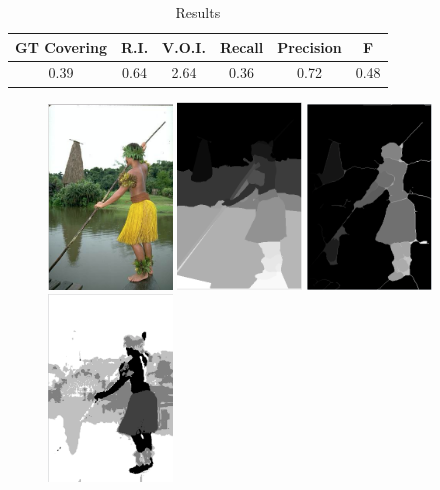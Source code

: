 \documentclass[10pt, twocolumn, twoside]{article}
\newcommand{\squeezeup}{\vspace{-2.5mm}}
\begin{document}
\begin{table}[ht]
\caption{Results} %
\centering %
\begin{tabular}{c c c c c c} %
\hline\hline %
GT Covering & R.I. & V.O.I. & Recall & Precision & F \\ [0.5ex] %
\hline %
 0.39 & 0.64 & 2.64 & 0.36 & 0.72 & 0.48 \\ 
\hline %
\end{tabular}
\label{table:table_l} %
\end{table}

\begin{figure}[h]
\squeezeup
\squeezeup
    \centering
    \includegraphics[width=1.3in]{images/original.png}
    \includegraphics[width=1.3in]{images/gr.png}
    \includegraphics[width=1.3in]{images/NN.png}
    \includegraphics[width=1.3in]{images/kmean.png}

\end{figure}
\end{document}
